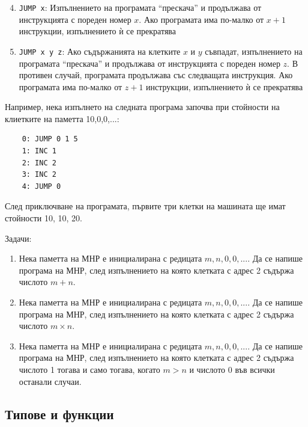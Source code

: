 \documentclass[12pt,a4paper]{article}
\begin{document}
{\begin{mdframed}[hidealllines=true,backgroundcolor=gray!20]
	\begin{enumerate}[label=\arabic*)]
	\setcounter{enumi}{3}
		\item \texttt{JUMP x}: Изпълнението на програмата ``прескача'' и продължава от инструкцията с пореден номер $x$. Ако програмата има по-малко от $x+1$ инструкции, изпълнението ѝ се прекратява
		\item \texttt{JUMP x y z}: Ако съдържанията на клетките  $x$ и $y$ съвпадат, изпълнението на програмата ``прескача'' и продължава от инструкцията с пореден номер $z$. В противен случай, програмата продължава със следващата инструкция. Ако програмата има по-малко от $z+1$ инструкции, изпълнението ѝ се прекратява
	\end{enumerate}

	Например, нека изпълнето на следната програма започва при стойности на клиетките на паметта 10,0,0,...:

	\begin{verbatim}
	0: JUMP 0 1 5
	1: INC 1
	2: INC 2
	3: INC 2
	4: JUMP 0

	\end{verbatim}

	След приключване на програмата, първите три клетки на машината ще имат стойности 10, 10, 20.

\end{mdframed}

Задачи:

\begin{enumerate}[resume]
	\item Нека паметта на МНР е инициалирана с редицата $m,n,0,0,...$. Да се напише програма на МНР, след изпълнението на която клетката с адрес 2 съдържа числото $m+n$.
	\item Нека паметта на МНР е инициалирана с редицата $m,n,0,0,...$. Да се напише програма на МНР, след изпълнението на която клетката с адрес 2 съдържа числото $m \times n$.
	\item Нека паметта на МНР е инициалирана с редицата $m,n,0,0,...$. Да се напише програма на МНР, след изпълнението на която клетката с адрес 2 съдържа числото 1 тогава и само тогава, когато $m>n$ и числото 0 във всички останали случаи.
\end{enumerate}


\subsection {Типове и функции}

}
\end{document}
